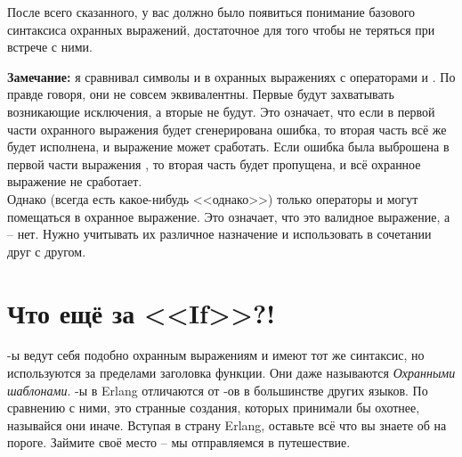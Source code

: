 После всего сказанного, у вас должно было появиться понимание базового синтаксиса охранных выражений, достаточное для того чтобы не теряться при встрече с ними.\\
\colorbox{lgray}
{
    \begin{minipage}{\linewidth}
        \textbf{Замечание:} я сравнивал символы \ops{,} и \ops{;} в охранных выражениях с операторами  и .
        По правде говоря, они не совсем эквивалентны.
        Первые будут захватывать возникающие исключения, а вторые не будут.
        Это означает, что если в первой части охранного выражения  будет сгенерирована ошибка, то вторая часть всё же будет исполнена, и выражение может сработать.
        Если ошибка была выброшена в первой части выражения , то вторая часть будет пропущена, и всё охранное выражение не сработает.\\ 
        Однако (всегда есть какое\--нибудь <<однако>>) только операторы  и  могут помещаться в охранное выражение.
        Это означает, что  это валидное выражение, а  \--- нет.
        Нужно учитывать их различное назначение и использовать в сочетании друг с другом.
    \end{minipage}
}

\section{Что ещё за <<If>>?!}
\--ы ведут себя подобно охранным выражениям и имеют тот же синтаксис, но используются за пределами заголовка функции.
Они даже называются \emph{Охранными шаблонами}.
\--ы в Erlang отличаются от \--ов в большинстве других языков.
По сравнению с ними, это странные создания, которых принимали бы охотнее, называйся они иначе.
Вступая в страну Erlang, оставьте всё что вы знаете об  на пороге.
Займите своё место \--- мы отправляемся в путешествие.

